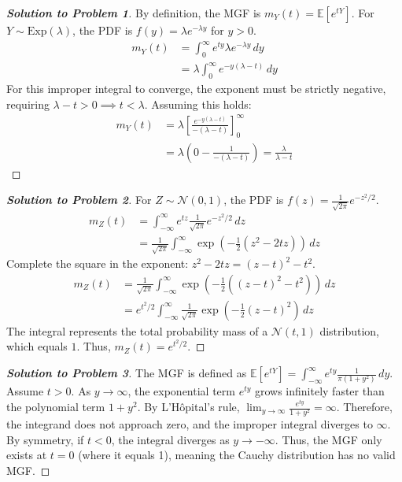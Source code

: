 \documentclass[11pt, a4paper]{article}
\theoremstyle{definition}
\theoremstyle{remark}
\newcommand{\E}{\mathbb{E}}
\begin{document}
\begin{proof}[\textbf{Solution to Problem 1}]
By definition, the MGF is $m_Y(t) = \E[e^{tY}]$. For $Y \sim \text{Exp}(\lambda)$, the PDF is $f(y) = \lambda e^{-\lambda y}$ for $y > 0$.
\begin{align*}
m_Y(t) &= \int_{0}^{\infty} e^{ty} \lambda e^{-\lambda y} \, dy \\
&= \lambda \int_{0}^{\infty} e^{-y(\lambda - t)} \, dy
\end{align*}
For this improper integral to converge, the exponent must be strictly negative, requiring $\lambda - t > 0 \implies t < \lambda$. Assuming this holds:
\begin{align*}
m_Y(t) &= \lambda \left[ \frac{e^{-y(\lambda - t)}}{-(\lambda - t)} \right]_{0}^{\infty} \\
&= \lambda \left( 0 - \frac{1}{-(\lambda - t)} \right) = \frac{\lambda}{\lambda - t}
\end{align*}
\end{proof}

\begin{proof}[\textbf{Solution to Problem 2}]
For $Z \sim \mathcal{N}(0,1)$, the PDF is $f(z) = \frac{1}{\sqrt{2\pi}} e^{-z^2/2}$.
\begin{align*}
m_Z(t) &= \int_{-\infty}^{\infty} e^{tz} \frac{1}{\sqrt{2\pi}} e^{-z^2/2} \, dz \\
&= \frac{1}{\sqrt{2\pi}} \int_{-\infty}^{\infty} \exp\left( -\frac{1}{2}(z^2 - 2tz) \right) \, dz
\end{align*}
Complete the square in the exponent: $z^2 - 2tz = (z - t)^2 - t^2$.
\begin{align*}
m_Z(t) &= \frac{1}{\sqrt{2\pi}} \int_{-\infty}^{\infty} \exp\left( -\frac{1}{2}((z - t)^2 - t^2) \right) \, dz \\
&= e^{t^2/2} \int_{-\infty}^{\infty} \frac{1}{\sqrt{2\pi}} \exp\left( -\frac{1}{2}(z - t)^2 \right) \, dz
\end{align*}
The integral represents the total probability mass of a $\mathcal{N}(t, 1)$ distribution, which equals $1$. Thus, $m_Z(t) = e^{t^2/2}$.
\end{proof}

\begin{proof}[\textbf{Solution to Problem 3}]
The MGF is defined as $\E[e^{tY}] = \int_{-\infty}^{\infty} e^{ty} \frac{1}{\pi(1+y^2)} \, dy$. 
Assume $t > 0$. As $y \to \infty$, the exponential term $e^{ty}$ grows infinitely faster than the polynomial term $1+y^2$. By L'H\^{o}pital's rule, $\lim_{y \to \infty} \frac{e^{ty}}{1+y^2} = \infty$. Therefore, the integrand does not approach zero, and the improper integral diverges to $\infty$. By symmetry, if $t < 0$, the integral diverges as $y \to -\infty$. Thus, the MGF only exists at $t=0$ (where it equals 1), meaning the Cauchy distribution has no valid MGF.
\end{proof}
\end{document}
